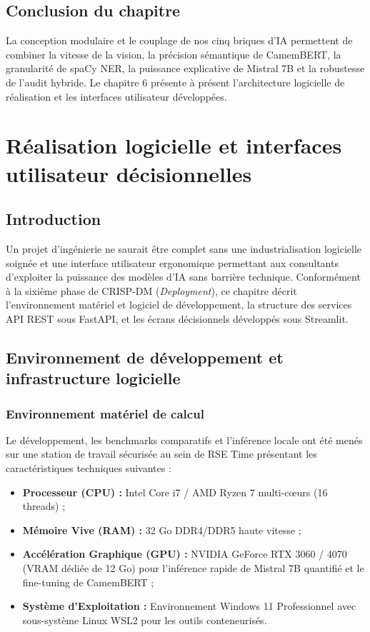 \documentclass[12pt,a4paper]{report}
\begin{document}
\section{Conclusion du chapitre}
La conception modulaire et le couplage de nos cinq briques d'IA permettent de combiner la vitesse de la vision, la précision sémantique de CamemBERT, la granularité de spaCy NER, la puissance explicative de Mistral 7B et la robustesse de l'audit hybride. Le chapitre 6 présente à présent l'architecture logicielle de réalisation et les interfaces utilisateur développées.

\newpage

\chapter{Réalisation logicielle et interfaces utilisateur décisionnelles}

\section{Introduction}
Un projet d'ingénierie ne saurait être complet sans une industrialisation logicielle soignée et une interface utilisateur ergonomique permettant aux consultants d'exploiter la puissance des modèles d'IA sans barrière technique. Conformément à la sixième phase de CRISP-DM (\textit{Deployment}), ce chapitre décrit l'environnement matériel et logiciel de développement, la structure des services API REST sous FastAPI, et les écrans décisionnels développés sous Streamlit.

\section{Environnement de développement et infrastructure logicielle}

\subsection{Environnement matériel de calcul}
Le développement, les benchmarks comparatifs et l'inférence locale ont été menés sur une station de travail sécurisée au sein de RSE Time présentant les caractéristiques techniques suivantes :
\begin{itemize}
    \item \textbf{Processeur (CPU) :} Intel Core i7 / AMD Ryzen 7 multi-cœurs (16 threads) ;
    \item \textbf{Mémoire Vive (RAM) :} 32 Go DDR4/DDR5 haute vitesse ;
    \item \textbf{Accélération Graphique (GPU) :} NVIDIA GeForce RTX 3060 / 4070 (VRAM dédiée de 12 Go) pour l'inférence rapide de Mistral 7B quantifié et le fine-tuning de CamemBERT ;
    \item \textbf{Système d'Exploitation :} Environnement Windows 11 Professionnel avec sous-système Linux WSL2 pour les outils conteneurisés.
\end{itemize}
\end{document}
